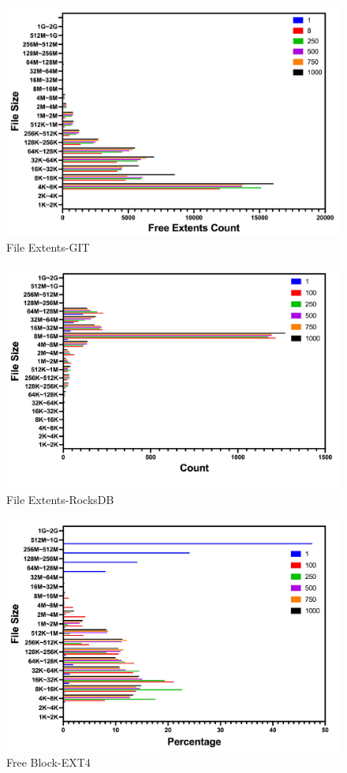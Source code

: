 \begin{figure}[t]
    \centering
	\includegraphics[width=0.95\columnwidth]{graphs/file_extents_git}
	\caption{File Extents-GIT}
	\label{f:file_extents_git}
\end{figure}

\begin{figure}[t]
    \centering
	\includegraphics[width=0.95\columnwidth]{graphs/file_extents_rocksdb}
	\caption{File Extents-RocksDB}
	\label{f:file_extents_rocksdb}
\end{figure}

\begin{figure}[t]
    \centering
	\includegraphics[width=0.95\columnwidth]{graphs/free_block_ext4}
	\caption{Free Block-EXT4}
	\label{f:free_block_ext4}
\end{figure}


